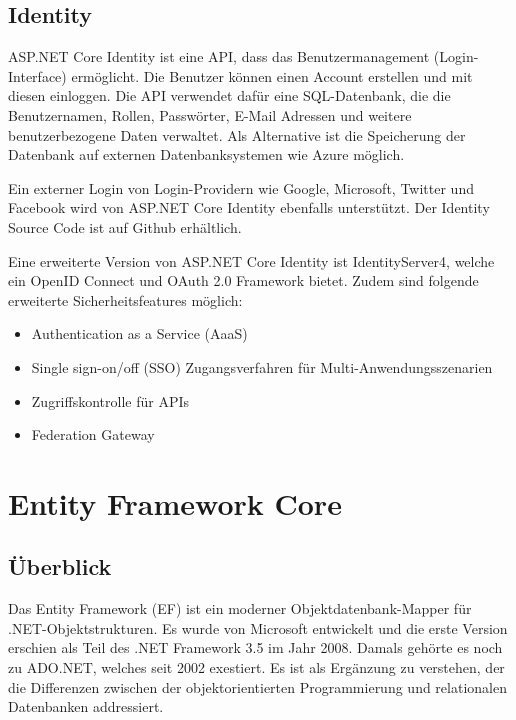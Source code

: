 \subsection{Identity}
\cite{ASPIdentityDoc}
\cite{ASPIdentityDocOld}

ASP.NET Core Identity ist eine API, dass das Benutzermanagement (Login-Interface) ermöglicht. 
Die Benutzer können einen Account erstellen und mit diesen einloggen. Die API verwendet dafür eine 
SQL-Datenbank, die die Benutzernamen, Rollen, Passwörter, E-Mail Adressen und weitere benutzerbezogene Daten verwaltet. 
Als Alternative ist die Speicherung der Datenbank auf externen Datenbanksystemen wie Azure möglich.

Ein externer Login von Login-Providern wie Google, Microsoft, Twitter und Facebook wird von ASP.NET Core Identity ebenfalls unterstützt.
Der Identity Source Code ist auf Github erhältlich.

Eine erweiterte Version von ASP.NET Core Identity ist IdentityServer4, welche ein OpenID Connect und OAuth 2.0 Framework bietet.
Zudem sind folgende erweiterte Sicherheitsfeatures möglich:

\begin{itemize}
    \item Authentication as a Service (AaaS)
    \item Single sign-on/off (SSO) Zugangsverfahren für Multi-Anwendungsszenarien
    \item Zugriffskontrolle für APIs
    \item Federation Gateway
\end{itemize}

\section{Entity Framework Core}
\subsection{Überblick}
\cite{CSharp8Rheinwerk}
\cite{EFCoreDocumentation}
\cite{EFCoreWikipedia}

Das Entity Framework (EF) ist ein moderner Objektdatenbank-Mapper für .NET-Objektstrukturen. Es
wurde von Microsoft entwickelt und die erste Version erschien als Teil des .NET Framework 3.5 im
Jahr 2008. Damals gehörte es noch zu ADO.NET, welches seit 2002 exestiert.  Es ist als Ergänzung zu verstehen, 
der die Differenzen zwischen der objektorientierten Programmierung und relationalen Datenbanken addressiert.

